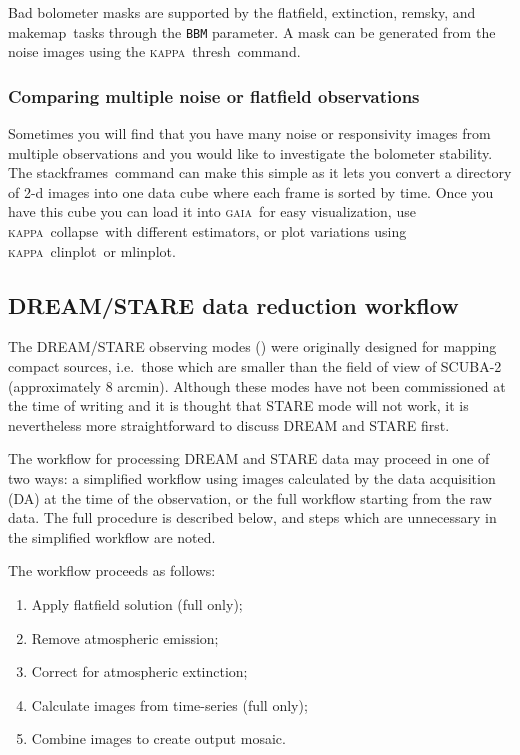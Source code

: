 \documentclass[twoside,11pt]{article}
\newcommand{\xref}[3]{#1}
\newcommand{\xlabel}[1]{}
\renewcommand{\_}{\texttt{\symbol{95}}}
\newcommand{\GAIA}{\textsc{gaia}}
\newcommand{\KAPPA}{\textsc{kappa}}
\newcommand{\task}[1]{\textsf{#1}}
\newcommand{\stackframes}{\xref{\task{stackframes}}{sun258}{STACKFRAMES}}
\newcommand{\extinction}{\xref{\task{extinction}}{sun258}{EXTINCTION}}
\newcommand{\flatfield}{\xref{\task{flatfield}}{sun258}{FLATFIELD}}
\newcommand{\makemap}{\xref{\task{makemap}}{sun258}{MAKEMAP}}
\newcommand{\remsky}{\xref{\task{remsky}}{sun258}{REMSKY}}
\newcommand{\clinplot}{\xref{\task{clinplot}}{sun95}{CLINPLOT}}
\newcommand{\mlinplot}{\xref{\task{mlinplot}}{sun95}{MLINPLOT}}
\newcommand{\collapse}{\xref{\task{collapse}}{sun95}{COLLAPSE}}
\newcommand{\thresh}{\xref{\task{thresh}}{sun95}{THRESH}}
\newcommand{\aparam}[1]{\texttt{#1}}     %
\begin{document}
Bad bolometer masks are supported by the \flatfield, \extinction,
\remsky, and \makemap\ tasks through the \aparam{BBM}
parameter. A mask can be generated from the noise images using the
\KAPPA\ \thresh\ command.

\subsubsection{Comparing multiple noise or flatfield observations}

Sometimes you will find that you have many noise or responsivity
images from multiple observations and you would like to investigate the
bolometer stability. The \stackframes\ command can make this simple as
it lets you convert a directory of 2-d images into one data cube where
each frame is sorted by time. Once you have this cube you can load it
into \GAIA\ for easy visualization, use \KAPPA\ \collapse\ with
different estimators, or plot variations using \KAPPA\ \clinplot\ or \mlinplot.

\subsection{\xlabel{dsworkflow}DREAM/STARE data reduction workflow\label{se:dsworkflow}}

The DREAM/STARE observing modes (\cite{scuba2}) were originally
designed for mapping compact sources, i.e.\ those which are smaller
than the field of view of SCUBA-2 (approximately 8 arcmin). Although
these modes have not been commissioned at the time of writing and it
is thought that STARE mode will not work, it is nevertheless more
straightforward to discuss DREAM and STARE first.

The workflow for processing DREAM and STARE data may proceed in one of
two ways: a simplified workflow using images calculated by the data
acquisition (DA) at the time of the observation, or the full workflow
starting from the raw data. The full procedure is described below, and
steps which are unnecessary in the simplified workflow are noted.

The workflow proceeds as follows:
\begin{enumerate}
\item Apply flatfield solution (full only);
\item Remove atmospheric emission;
\item Correct for atmospheric extinction;
\item Calculate images from time-series (full only);
\item Combine images to create output mosaic.
\end{enumerate}
\end{document}
